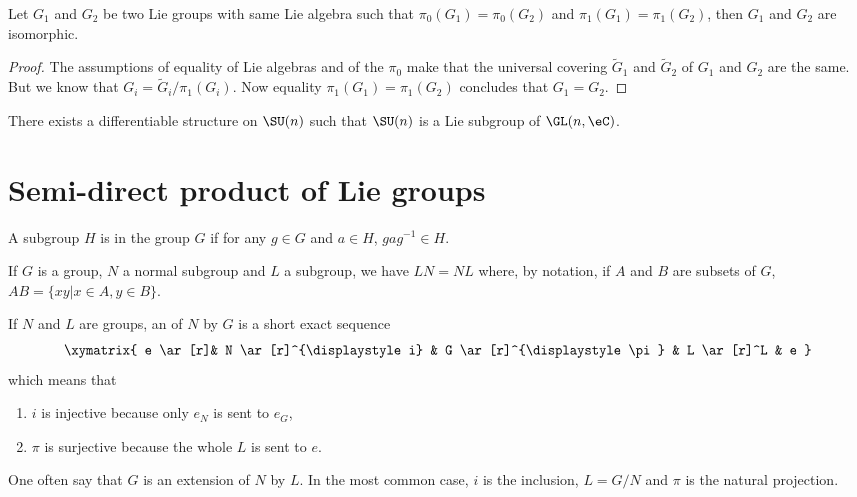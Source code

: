 \begin{proposition}
Let $G_1$ and $G_2$ be two Lie groups with same Lie algebra such that $\pi_0(G_1)=\pi_0(G_2)$ and $\pi_1(G_1)=\pi_1(G_2)$, then $G_1$ and $G_2$ are isomorphic.
\end{proposition}

\begin{proof}
The assumptions of equality of Lie algebras and of the $\pi_0$ make that the universal covering $\tilde G_1$ and $\tilde G_2$ of $G_1$ and $G_2$ are the same. But we know that $G_i=\tilde G_i/\pi_1(G_i)$. Now equality $\pi_1(G_1)=\pi_1(G_2)$ concludes that $G_1=G_2$.
\end{proof}

\begin{proposition}     \label{PROPooWMKGooKftzGv}
    There exists a differentiable structure on \( \SU(n)\) such that \( \SU(n)\) is a Lie subgroup of \( \GL(n,\eC)\).
\end{proposition}

\section{Semi-direct product of Lie groups}

\begin{definition}
A subgroup $H$ is  in the group $G$ if for any $g\in G$ and $a\in H$, $gag^{-1}\in H$.
\end{definition}

If $G$ is a group, $N$ a normal subgroup and $L$ a subgroup, we have $LN=NL$ where, by notation, if $A$ and $B$ are subsets of $G$, $AB=\{xy|x\in A,y\in B\}$.

If $N$ and $L$ are groups, an  of $N$ by $G$ is a short exact sequence
\begin{equation}
\xymatrix{ e \ar[r]& N \ar[r]^{\displaystyle i} & G \ar[r]^{\displaystyle \pi} & L \ar[r]^L  & e }
\end{equation}
which means that

\begin{enumerate}
\item $i$ is injective because only $e_N$ is sent to $e_G$,
\item $\pi$ is surjective because the whole $L$ is sent to $e$.
\end{enumerate}
One often say that $G$ is an extension of $N$ by $L$. In the most common case, $i$ is the inclusion, $L=G/N$ and $\pi$ is the natural projection.

